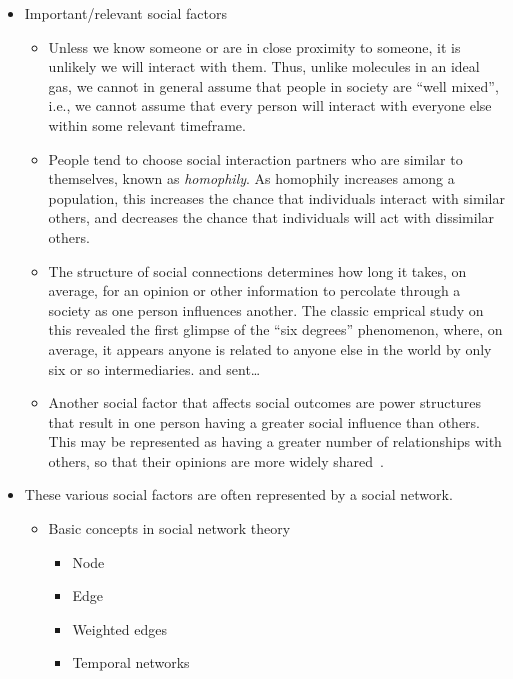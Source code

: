 \documentclass[12pt,letterpaper]{article}
\begin{document}
\begin{itemize}
  \item 
    Important/relevant social factors
    \begin{itemize}
      \item 
        Unless we know someone or are in close proximity to someone, it is
        unlikely we will interact with them. Thus, unlike molecules in an
        ideal gas, we cannot in general assume that people in society are
        ``well mixed'', i.e., we cannot assume 
        that every person will interact with everyone else within some 
        relevant timeframe.
      \item
        People tend to choose social interaction partners who 
        are similar to themselves, known as \emph{homophily}. As homophily
        increases among a population, this
        increases the chance that individuals interact with similar others, 
        and decreases the chance that individuals will act with dissimilar
        others.
      \item
        The structure of social connections determines how long it takes, on average, for an opinion
        or other information to percolate through a society as one person
        influences another. The classic emprical study on this revealed the
        first glimpse of the ``six degrees'' phenomenon, where, on average,
        it appears anyone is related to anyone else in the world by only
        six or so intermediaries.  and 
        sent\ldots
      \item
        Another social factor that affects social outcomes are power structures
        that result in one person having a greater social influence than others.
        This may be represented as having a greater number of relationships
        with others, so that their opinions are more widely shared~\cite{French1956,Friedkin1986}.
    \end{itemize}

  \item
    These various social factors are often represented by a social network.
    \begin{itemize}
      \item 
        Basic concepts in social network theory
        \begin{itemize}
          \item 
            Node
          \item
            Edge
          \item
            Weighted edges
          \item
            Temporal networks
        \end{itemize}
    \end{itemize}
    
\end{itemize}
\end{document}
